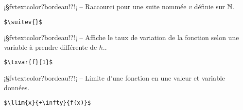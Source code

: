 \documentclass[11pt,a4paper,rgb]{report}
\begin{document}
\setlength{\leftskip}{0pt}
\setlength{\textwidth}{18cm}%


\vspace*{.75cm}

\inCodeStub¡§fvtextcolor?bordeau!?\suitev{}!¡ -- Raccourci pour une suite nommée $v$ définie sur $\mathbb{N}$.

\setlength{\leftskip}{.75cm}%
\setlength{\textwidth}{17.25cm}%

\colorbox{blue!15}{}
\hfill
\begin{minipage}{.65\textwidth}
	\begin{lstlisting}[linewidth=\textwidth, language={[LaTeX]TeX}]
	$\suitev{}$
	\end{lstlisting}
\end{minipage}

\setlength{\leftskip}{0pt}
\setlength{\textwidth}{18cm}%


\vspace*{.75cm}

\inCodeStub¡§fvtextcolor?bordeau!?!¡ -- Affiche le taux de variation de la fonction selon une variable à prendre différente de $h$..

\setlength{\leftskip}{.75cm}%
\setlength{\textwidth}{17.25cm}%

\colorbox{blue!15}{}
\hfill
\begin{minipage}{.65\textwidth}
	\begin{lstlisting}[linewidth=\textwidth, language={[LaTeX]TeX}]
	$\txvar{f}{1}$
	\end{lstlisting}
\end{minipage}

\setlength{\leftskip}{0pt}
\setlength{\textwidth}{18cm}%


\vspace*{.75cm}

\inCodeStub¡§fvtextcolor?bordeau!?!¡ -- Limite d'une fonction en une valeur et variable données.

\setlength{\leftskip}{.75cm}%
\setlength{\textwidth}{17.25cm}%

\colorbox{blue!15}{}
\hfill
\begin{minipage}{.65\textwidth}
	\begin{lstlisting}[linewidth=\textwidth, language={[LaTeX]TeX}]
	$\llim{x}{+\infty}{f(x)}$
	\end{lstlisting}
\end{minipage}
\end{document}
